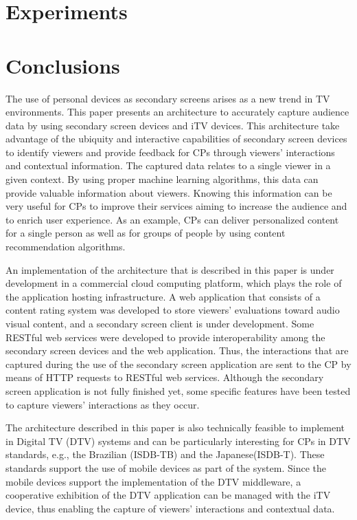 \documentclass[journal]{IEEEtran}
\begin{document}
\section{Experiments}

\section{Conclusions}

The use of personal devices as secondary screens arises as a new trend in TV environments. This paper presents an architecture to accurately capture audience data by using secondary screen devices and iTV devices. This architecture take advantage of the ubiquity and interactive capabilities of secondary screen devices to identify viewers and provide feedback for CPs through viewers' interactions and contextual information. The captured data relates to a single viewer in a given context. By using proper machine learning algorithms, this data can provide valuable information about viewers. Knowing this information can be very useful for CPs to improve their services aiming to increase the audience and to enrich user experience. As an example, CPs can deliver personalized content for a single person as well as for groups of people by using content recommendation algorithms.

An implementation of the architecture that is described in this paper is under development in a commercial cloud computing platform, which plays the role of the application hosting infrastructure. A web application that consists of a content rating system was developed to store  viewers' evaluations toward audio visual content, and a secondary screen client is under development. Some RESTful web services were developed to provide interoperability among the secondary screen devices and the web application. Thus, the interactions that are captured during the use of the secondary screen application are sent to the CP by means of HTTP requests to RESTful web services. Although the secondary screen application is not fully finished yet, some specific features have been tested to capture viewers' interactions as they occur.

The architecture described in this paper is also technically feasible to implement in Digital TV (DTV) systems and can be particularly interesting for CPs in DTV standards, e.g., the Brazilian (ISDB-TB) and the Japanese(ISDB-T). These standards support the use of mobile devices as part of the system. Since the mobile devices support the implementation of the DTV middleware, a cooperative exhibition of the DTV application can be managed with the iTV device, thus enabling the capture of viewers' interactions and contextual data.



\end{document}
